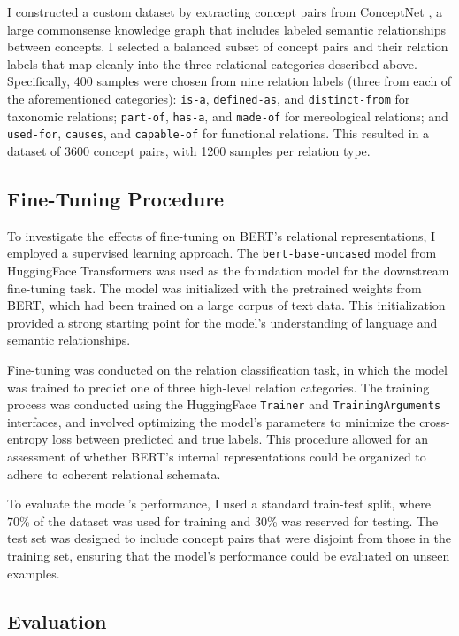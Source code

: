 \documentclass[stu,floatsintext]{apa7}
\begin{document}
I constructed a custom dataset by extracting concept pairs from ConceptNet \parencite{speer2017conceptnet}, a large commonsense knowledge graph that includes labeled semantic relationships between concepts. I selected a balanced subset of concept pairs and their relation labels that map cleanly into the three relational categories described above. Specifically, 400 samples were chosen from nine relation labels (three from each of the aforementioned categories): \texttt{is-a}, \texttt{defined-as}, and \texttt{distinct-from} for taxonomic relations; \texttt{part-of}, \texttt{has-a}, and \texttt{made-of} for mereological relations; and \texttt{used-for}, \texttt{causes}, and \texttt{capable-of} for functional relations. This resulted in a dataset of 3600 concept pairs, with 1200 samples per relation type.

\subsection{Fine-Tuning Procedure}

To investigate the effects of fine-tuning on BERT's relational representations, I employed a supervised learning approach. The \texttt{bert-base-uncased} model from HuggingFace Transformers was used as the foundation model for the downstream fine-tuning task. The model was initialized with the pretrained weights from BERT, which had been trained on a large corpus of text data. This initialization provided a strong starting point for the model's understanding of language and semantic relationships.

Fine-tuning was conducted on the relation classification task, in which the model was trained to predict one of three high-level relation categories. The training process was conducted using the HuggingFace \texttt{Trainer} and \texttt{TrainingArguments} interfaces, and involved optimizing the model's parameters to minimize the cross-entropy loss between predicted and true labels. This procedure allowed for an assessment of whether BERT's internal representations could be organized to adhere to coherent relational schemata.

To evaluate the model's performance, I used a standard train-test split, where 70\% of the dataset was used for training and 30\% was reserved for testing. The test set was designed to include concept pairs that were disjoint from those in the training set, ensuring that the model's performance could be evaluated on unseen examples.

\subsection{Evaluation}
\end{document}
